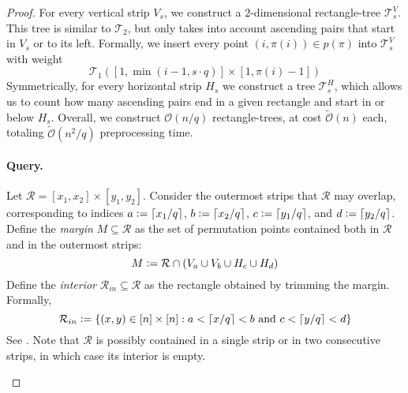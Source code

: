 \documentclass{article}
\newcommand{\eqdef}{\vcentcolon=}
\theoremstyle{remark}
\newcommand{\Otilde}[1]{\widetilde{\mathcal{O}}\left( #1 \right)}
\newcommand{\Oh}[1]{\mathcal{O}\left( #1 \right)}
\theoremstyle{plain}
\begin{document}
\begin{proof}
    For every vertical strip $V_s$, we construct a $2$-dimensional rectangle-tree $\mathcal{T}^V_s$.
    This tree is similar to $\mathcal{T}_2$, but only takes into account ascending pairs that start in $V_s$ or to its left.
    Formally, we insert every point $(i,\pi(i))\in p(\pi)$ into $\mathcal{T}^V_s$ with weight
    \[
    \mathcal{T}_1([1,\min(i-1, s\cdot q)] \times [1,\pi(i)-1])
    \]
    Symmetrically, for every horizontal strip $H_s$ we construct a tree $\mathcal{T}^H_s$,
    which allows us to count how many ascending pairs end in a given rectangle and start in or below $H_s$.
    Overall, we construct $\Oh{n/q}$ rectangle-trees, at cost $\Otilde{n}$ each, totaling $\Otilde{n^2/q}$ preprocessing time.

    \paragraph{Query.}
    Let $\mathcal{R} = [x_1,x_2] \times [y_1,y_2]$.
    Consider the outermost strips that $\mathcal{R}$ may overlap,
    corresponding to indices $a\eqdef \lceil x_1/q\rceil$, $b\eqdef \lceil x_2/q\rceil$, $c\eqdef \lceil y_1/q\rceil$, and $d\eqdef \lceil y_2/q\rceil$. Define the \emph{margin} $M\subseteq \mathcal{R}$ as the set of permutation points contained both in $\mathcal{R}$ and in the outermost strips:
    \[
    M\eqdef \mathcal{R} \cap \left( V_a \cup V_b \cup H_c \cup H_d\right)
    \]
    Define the \emph{interior} $\mathcal{R}_{in}\subseteq \mathcal{R}$ as the rectangle obtained by trimming the margin. Formally,
    \[
    \mathcal{R}_{in} \eqdef \left\{ (x,y)\in [n]\times [n] : a < \lceil x / q\rceil  < b \text{ and } c < \lceil y / q \rceil < d \right\}
    \]
    See . Note that $\mathcal{R}$ is possibly contained in a single strip or in two consecutive strips, in which case its interior is empty. \ \\

    \begin{figure}[ht]
        \centering
\end{figure}
\end{proof}
\end{document}
